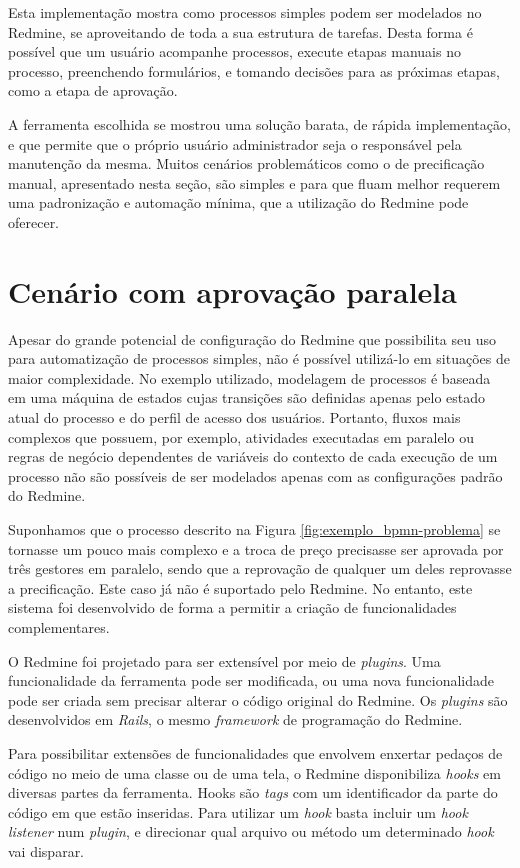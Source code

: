 Esta implementação mostra como processos simples podem ser modelados no Redmine, se aproveitando de toda a sua estrutura de tarefas. Desta forma é possível que um usuário acompanhe processos, execute etapas manuais no processo, preenchendo formulários, e tomando decisões para as próximas etapas, como a etapa de aprovação.

A ferramenta escolhida se mostrou uma solução barata, de rápida implementação, e que permite que o próprio usuário administrador seja o responsável pela manutenção da mesma. 
Muitos cenários problemáticos como o de precificação manual, apresentado nesta seção, são simples e para que fluam melhor requerem uma padronização e automação mínima, que a utilização do Redmine pode oferecer.

\section{Cenário com aprovação paralela}\label{sec:cenario-complexo}

Apesar do grande potencial de configuração do Redmine que possibilita seu uso para automatização de processos simples, não é possível utilizá-lo em situações de maior complexidade. No exemplo utilizado, modelagem de processos é baseada em uma máquina de estados cujas transições são definidas apenas pelo estado atual do processo e do perfil de acesso dos usuários. Portanto, fluxos mais complexos que possuem, por exemplo, atividades executadas em paralelo ou regras de negócio dependentes de variáveis do contexto de cada execução de um processo não são possíveis de ser modelados apenas com as configurações padrão do Redmine.

Suponhamos que o processo descrito na Figura \ref{fig:exemplo_bpmn-problema} se tornasse um pouco mais complexo e a troca de preço precisasse ser aprovada por três gestores em paralelo, sendo que a reprovação de qualquer um deles reprovasse a precificação. Este caso já não é suportado pelo Redmine. No entanto, este sistema foi desenvolvido de forma a permitir a criação de funcionalidades complementares.

O Redmine foi projetado para ser extensível por meio de \textit{plugins}. Uma funcionalidade da ferramenta pode ser modificada, ou uma nova funcionalidade pode ser criada sem precisar alterar o código original do Redmine. Os \textit{plugins} são desenvolvidos em \textit{Rails}, o mesmo \textit{framework} de programação do Redmine. 

Para possibilitar extensões de funcionalidades que envolvem enxertar pedaços de código no meio de uma classe ou de uma tela, o Redmine disponibiliza \textit{hooks} em diversas partes da ferramenta. Hooks são \textit{tags} com um identificador da parte do código em que estão inseridas. Para utilizar um \textit{hook} basta incluir um \textit{hook} \textit{listener} num \textit{plugin}, e direcionar qual arquivo ou método um determinado \textit{hook} vai disparar.


